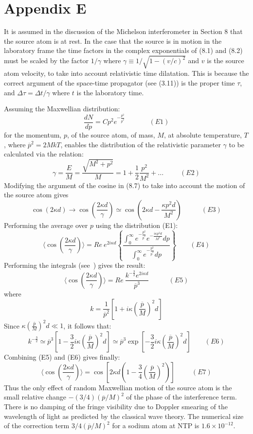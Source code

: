 \documentclass [12pt]{article}
\begin{document}
{  \section*{\bf Appendix E}
  \par It is assumed in the discussion of the Michelson interferometer in Section 8 that the source atom
  is at rest. In the case that the source is in motion in the laboratory frame the time
   factors in the complex exponentials of (8.1) and (8.2) must be scaled by the factor $1/\gamma$
 where $\gamma \equiv 1/\sqrt{1-(v/c)^2}$ and $v$ is the source atom velocity, to take into
  account relativistic time dilatation. This is because the correct argument of the space-time
  propagator (see (3.11)) is the proper time $\tau$, and $\Delta \tau = \Delta t/\gamma$
  where $t$ is the laboratory time.
  \par Assuming the Maxwellian distribution:
  \[ \frac{dN}{dp} = Cp^2 e^{-\frac{p^2}{\overline{p}^2}} ~~~~~~~~~~~~~~~~(E1)\]
  for the momentum, $p$, of the source atom, of mass, $M$, at absolute temperature, $T$,
   where $\overline{p}^2 = 2MkT$,
   enables the distribution of the
  relativistic parameter $\gamma$ to be calculated via the relation:
  \[ \gamma = \frac{E}{M} = \frac{\sqrt{M^2+p^2}}{M} = 1+ \frac{1}{2} \frac{p^2}{M^2}+ ...~~~~~~~~~~~(E2)\]
  Modifying the argument of the cosine in
   (8.7) to take into account the motion of the source atom gives
\[ \cos(2 \kappa d) \rightarrow  \cos(\frac{2 \kappa d}{\gamma}) \simeq  \cos(2 \kappa d- \frac{\kappa p^2 d}{M^2})
   ~~~~~~~~~~~~~(E3) \]
 Performing the average over $p$ using the distribution (E1):
 \[ \langle  \cos(\frac{2 \kappa d}{\gamma}) \rangle = Re~ e^{2i \kappa d} \left\{
  \frac{\int_0^{\infty} e^{-\frac{p^2}{\overline{p}^2}}  e^{-\frac{i \kappa  p^2 d}{M^2}} dp}
    {\int_0^{\infty}  e^{-\frac{p^2}{\overline{p}^2}} dp} \right\}~~~~~~~~~(E4) \]  
 Performing the integrals (see~\cite{Jeans}) gives the result:
  \[ \langle  \cos(\frac{2 \kappa d}{\gamma}) \rangle = Re~\frac{k^{-\frac{3}{2}} e^{2 i \kappa d}}
    {\overline{p}^3}~~~~~~~~~~~~~(E5) \]
  where 
  \[ k = \frac{1}{\overline{p}^2}[1+ i \kappa\left(\frac{\overline{p}}{M}\right)^2 d] \]
  Since $\kappa\left(\frac{\overline{p}}{M}\right)^2 d \ll 1$, it follows that:
 \[ k^{-\frac{3}{2}} \simeq \overline{p}^3[1-\frac{3}{2}i \kappa\left(\frac{\overline{p}}{M}\right)^2 d]
  \simeq   \overline{p}^3 \exp\left[-\frac{3}{2}i \kappa\left(\frac{\overline{p}}{M}\right)^2 d\right]~~~~~~~~~(E6) \]
  Combining (E5) and (E6) gives finally:
 \[ \langle  \cos(\frac{2 \kappa d}{\gamma}) \rangle = \cos \left[ 2 \kappa d(1- 
  \frac{3}{4}\left(\frac{\overline{p}}{M}\right)^2)\right]~~~~~~~~~~~(E7) \]
  Thus the only effect of random Maxwellian motion of the source atom is the small relative change $-(3/4)(\overline{p}
   /M)^2$ of the phase of the interference term. There is no damping of the fringe visibility due
    to Doppler smearing of the wavelength of light as predicted by the classical wave theory.
     The numerical size of the correction term $3/4(\overline{p}/M)^2$ for a sodium atom at NTP is
     $1.6 \times 10^{-12}$.

}
\end{document}
